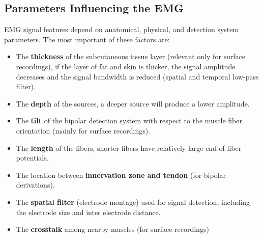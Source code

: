\documentclass[10pt, letterpaper]{report}
\begin{document}
\subsection{Parameters Influencing the EMG}
EMG signal features depend on anatomical, physical, and detection system parameters. The most important of these factors are:\begin{itemize}
     \item The \textbf{thickness} of the subcutaneous tissue layer (relevant only for surface recordings), if the layer of fat and skin is thicker, the signal amplitude decreases and the signal bandwidth is reduced (spatial and temporal low-pass filter).
     \item The \textbf{depth} of the sources, a deeper source will produce a lower amplitude.
     \item The \textbf{tilt} of the bipolar detection system with respect to the muscle fiber orientation (mainly for surface recordings).
     \item The \textbf{length} of the fibers, shorter fibers have relatively large end-of-fiber potentials. 
     \item The location between \textbf{innervation zone and tendon} (for bipolar derivations).
     \item The \textbf{spatial filter} (electrode montage) used for signal detection, including the electrode size and inter electrode distance.
     \item The \textbf{crosstalk} among nearby muscles (for surface recordings)
\end{itemize}
\end{document}
